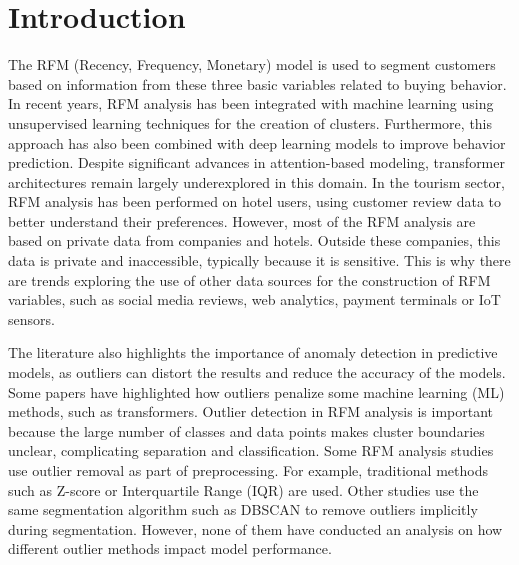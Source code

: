 \documentclass{ws-ijitdm}
\begin{document}
\newpage

\section{Introduction} \label{sec:intro}

The RFM (Recency, Frequency, Monetary) model is used to segment customers based on information from these three basic variables related to buying behavior\cite{1}. In recent years, RFM analysis has been integrated with machine learning using unsupervised learning techniques for the creation of clusters\cite{3,4,5}. Furthermore, {\color{black}this approach has also been combined with deep learning models\cite{6,7,8} to improve behavior prediction. Despite significant advances in attention-based modeling\cite{TFUZZ2024,Frontiers2023,Bentham2019}, transformer architectures remain largely underexplored in this domain.} In the tourism sector, RFM analysis has been performed on hotel users\cite{9,10}, using customer review data to better understand their preferences. However, most of the RFM analysis are based on private data from companies and hotels\cite{11,12}. Outside these companies, this data is private and inaccessible, typically because it is sensitive. This is why there are trends exploring the use of other data sources for the construction of RFM variables, such as social media reviews, web analytics, payment terminals or IoT sensors\cite{7,8,13,14}.

The literature also highlights the importance of anomaly detection in predictive models, as outliers can distort the results and reduce the accuracy of the models\cite{15,16}. Some papers have highlighted how outliers penalize some machine learning (ML) methods, such as transformers\cite{17,18}. Outlier detection in RFM analysis is important because {\color{black}the large number of classes and data points makes cluster boundaries unclear, complicating separation and classification.} Some RFM analysis studies use outlier removal as part of preprocessing. For example, traditional methods such as Z-score\cite{19} or Interquartile Range (IQR)\cite{20} are used. Other studies use the same segmentation algorithm such as DBSCAN to remove outliers implicitly during segmentation\cite{21,22}. However, none of them have conducted an analysis on how different outlier methods impact model performance. 
\end{document}
